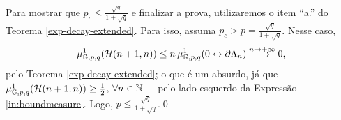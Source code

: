 Para mostrar que $p_c \leq \frac{\sqrt{q}}{1 + \sqrt{q}}$ e finalizar a prova, utilizaremos o item ``a.'' do Teorema \ref{exp-decay-extended}. Para isso, assuma $p_c > p = \frac{\sqrt{q}}{1 + \sqrt{q}}$. Nesse caso,
\begin{align*}
\mu_{\mathbb{G}, p, q}^1(\operatorname{\mathcal{H}}(n + 1, n)) \leq n\, \mu_{\mathbb{G}, p, q}^{1}(0 \leftrightarrow \partial\Lambda_n) \overset{n \rightarrow +\infty}{\longrightarrow} 0,
\end{align*}
pelo Teorema \ref{exp-decay-extended}; o que é um absurdo, já que $\mu_{\mathbb{G}, p, q}^1(\operatorname{\mathcal{H}}(n + 1, n)) \geq \frac{1}{2}$, $\forall n \in \operatorname{\mathbb{N}}$ $-$ pelo lado esquerdo da Expressão \eqref{in:boundmeasure}. Logo, $p \leq \frac{\sqrt{q}}{1 + \sqrt{q}}$.\hspace{\fill}\qed